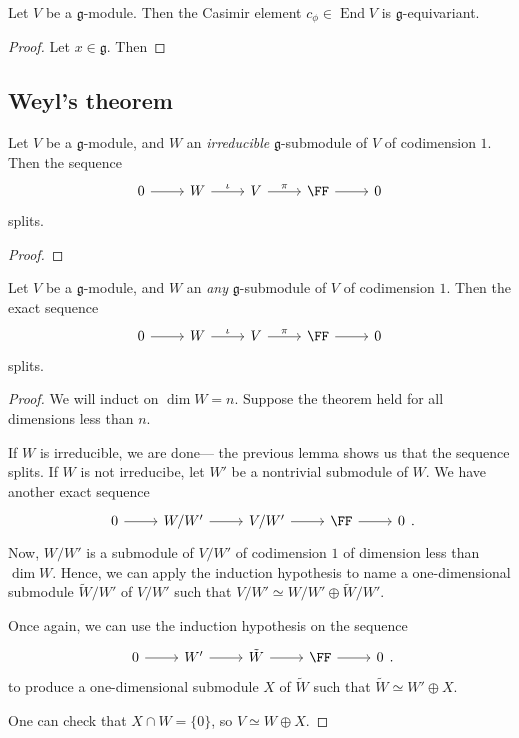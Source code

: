 \documentclass{article}
\DeclareMathOperator{\End}{End}
\newcommand*\frkg{{\ensuremath{\mathfrak{g}}}}
\begin{document}
\begin{proposition}
    Let $V$ be a $\frkg$-module.
    Then the Casimir element $c_\phi \in \End V$ is $\frkg$-equivariant.
\end{proposition}

\begin{proof}
    Let $x \in \frkg$.
    Then
\end{proof}

\subsection{Weyl's theorem}

\begin{lemma}
    Let $V$ be a $\frkg$-module, and $W$ an \textit{irreducible} $\frkg$-submodule of $V$ of codimension $1$.
    Then the sequence
    \[
        \begin{tikzcd}
            0 \arrow[r] & W \arrow[r, "\iota"] & V \arrow[r, "\pi"] & \FF \arrow[r] & 0
\end{tikzcd}
    \]
    splits.
\end{lemma}

\begin{proof}

\end{proof}

\begin{lemma}
    Let $V$ be a $\frkg$-module, and $W$ an \textit{any} $\frkg$-submodule of $V$ of codimension $1$.
    Then the exact sequence
    \[
        \begin{tikzcd}
            0 \arrow[r] & W \arrow[r, "\iota"] & V \arrow[r, "\pi"] & \FF \arrow[r] & 0
        \end{tikzcd}
    \]
    splits.
\end{lemma}

\begin{proof}
    We will induct on $\dim W = n$.
    Suppose the theorem held for all dimensions less than $n$. 

    If $W$ is irreducible, we are done--- the previous lemma shows us that the sequence splits.
    If $W$ is not irreducibe, let $W'$ be a nontrivial submodule of $W$.
    We have another exact sequence
    \[
        \begin{tikzcd}
            0 \arrow[r] & W/W' \arrow[r] & V/W' \arrow[r] & \FF \arrow[r] & 0
        \end{tikzcd}.
    \]
    Now, $W/W'$ is a submodule of $V/W'$ of codimension $1$ of dimension less than $\dim W$.
    Hence, we can apply the induction hypothesis to name a one-dimensional submodule $\tilde{W}/W'$ of $V/W'$ such that $V/W' \simeq W/W' \oplus \tilde{W}/W'$.

    Once again, we can use the induction hypothesis on the sequence
    \[
        \begin{tikzcd}
            0 \arrow[r] & W' \arrow[r] & \tilde{W} \arrow[r] & \FF \arrow[r] & 0
        \end{tikzcd}.
    \]
    to produce a one-dimensional submodule $X$ of $\tilde{W}$ such that $\tilde{W} \simeq W' \oplus X$.

    One can check that $X \cap W = \{0\}$, so $V \simeq W \oplus X$.
\end{proof}
\end{document}
